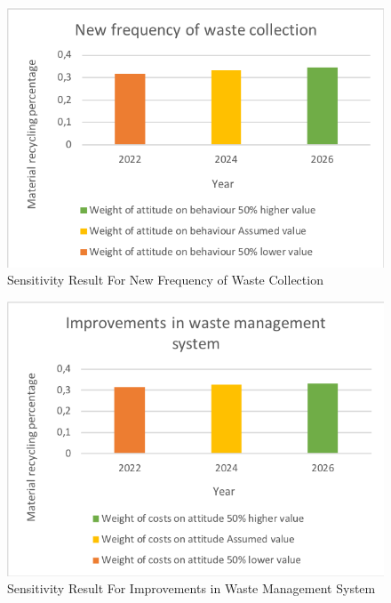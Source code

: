 \begin{figure}[H]
\centering
\includegraphics [scale=0.80,angle=360]{figures/sensitivitynewf.png}
\caption{Sensitivity Result For New Frequency of Waste Collection}
\label{fig:sensitivitynewf}
\end{figure}

\begin{figure}[H]
\centering
\includegraphics [scale=0.80,angle=360]{figures/sensitivityi.png}
\caption{Sensitivity Result For Improvements in Waste Management System}
\label{fig:sensitivityi}
\end{figure}